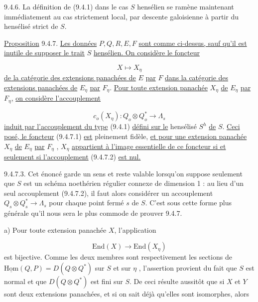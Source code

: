 9.4.6. La définition de (9.4.1) dans le cas $S$ hensélien se ramène maintenant immédiatement au cas strictement local, par descente galoisienne à partir du hensélisé strict de $S$.

\underline{Proposition} 9.4.7. \underline{Les données} $P,Q,R,E,F$ \underline{sont comme ci-dessus, sauf qu'il est inutile de supposer le trait} $S$ \underline{hensélien. On considère le foncteur}

\begin{equation}\tag{9.4.7.1}
X \longmapsto X_\eta
\end{equation}
\underline{de la catégorie des extensions panachées de} $E$ \underline{par} $F$ \underline{dans la catégorie des extensions panachées de} $E_\eta$ \underline{par} $F_\eta$. \underline{Pour toute extension panachée} $X_\eta$ \underline{de} $E_\eta$ \underline{par} $F_\eta$, \underline{on considère l'accouplement}

\begin{equation}\tag{9.4.7.2}
c_o(X_\eta) : Q_o \otimes Q_o^* \longrightarrow \Lambda_s
\end{equation}
\underline{induit par l'accouplement du type} (9.4.1) \underline{défini sur le} hensélisé $S^h$ \underline{de} $S$. \underline{Ceci posé, le foncteur} (9.4.7.1) \underline{est} pleinement fidèle, \underline{et pour une extension panachée} $X_\eta$ \underline{de} $E_\eta$ \underline{par} $F_\eta$ , $X_\eta$ \underline{appartient à l'image essentielle de ce foncteur si et seulement si l'accouplement} (9.4.7.2) \underline{est nul.}



9.4.7.3.  Cet énoncé garde un sens et reste valable lorsqu'on suppose seulement que $S$ est un schéma noethérien régulier connexe de dimension 1 : au lieu d'un seul accouplement (9.4.7.2), il faut alors considérer un accouplement $Q_s \otimes Q_s^* \longrightarrow \Lambda_s$ pour chaque point fermé $s$ de $S$. C'est sous cette forme plus générale qu'il nous sera le plus commode de prouver 9.4.7.

a)  Pour toute extension panachée $X$, l'application

\begin{equation*}
\mathrm{End}(X) \longrightarrow \mathrm{End}(X_\eta)
\end{equation*}
est bijective. Comme les deux membres sont respectivement les sections de $\underline{\mathrm{Hom}}(Q,P) = D(Q \otimes Q^*)$ sur $S$ et sur $\eta$ , l'assertion provient du fait que $S$ est normal et que $D(Q \otimes Q^*)$ est fini sur $S$. De ceci résulte aussitôt que si $X$ et $Y$ sont deux extensions panachées, et si on sait déjà qu'elles sont isomorphes, alors

